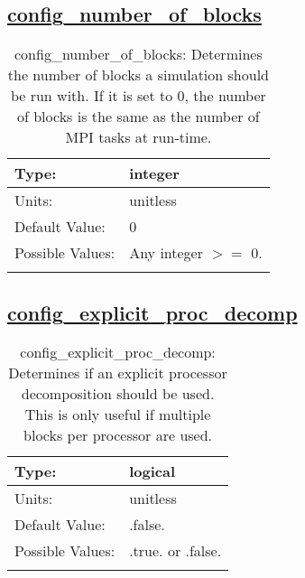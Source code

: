 \subsection[config\_number\_of\_blocks]{\hyperref[sec:nm_tab_decomposition]{config\_number\_of\_blocks}}
\label{subsec:nm_sec_config_number_of_blocks}
\begin{center}
\begin{longtable}{| p{2.0in} || p{4.0in} |}
    \hline
    Type: & integer \\
    \hline
    Units: & \si{unitless} \\
    \hline
    Default Value: & 0 \\
    \hline
    Possible Values: & Any integer $>=$ 0. \\
    \hline
    \caption{config\_number\_of\_blocks: Determines the number of blocks a simulation should be run with. If it is set to 0, the number of blocks is the same as the number of MPI tasks at run-time.}
\end{longtable}
\end{center}
\subsection[config\_explicit\_proc\_decomp]{\hyperref[sec:nm_tab_decomposition]{config\_explicit\_proc\_decomp}}
\label{subsec:nm_sec_config_explicit_proc_decomp}
\begin{center}
\begin{longtable}{| p{2.0in} || p{4.0in} |}
    \hline
    Type: & logical \\
    \hline
    Units: & \si{unitless} \\
    \hline
    Default Value: & .false. \\
    \hline
    Possible Values: & .true. or .false. \\
    \hline
    \caption{config\_explicit\_proc\_decomp: Determines if an explicit processor decomposition should be used. This is only useful if multiple blocks per processor are used.}
\end{longtable}
\end{center}
